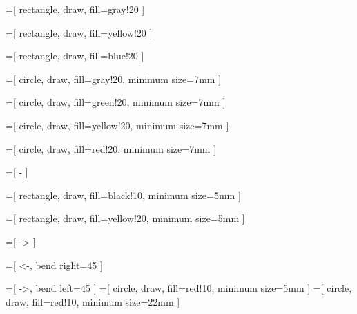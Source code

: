 
=[
	rectangle,
	draw,
	fill=gray!20
]

=[
	rectangle,
	draw,
	fill=yellow!20
]

=[
	rectangle,
	draw,
	fill=blue!20
]

=[
	circle,
	draw,
	fill=gray!20,
	minimum size=7mm
]

=[
	circle,
	draw,
	fill=green!20,
	minimum size=7mm
]

=[
	circle,
	draw,
	fill=yellow!20,
	minimum size=7mm
]

=[
	circle,
	draw,
	fill=red!20,
	minimum size=7mm
]

=[
	-
]

=[
	rectangle,
	draw,
	fill=black!10,
	minimum size=5mm
]

=[
	rectangle,
	draw,
	fill=yellow!20,
	minimum size=5mm
]

=[
	->
]

=[
	<-,
	bend right=45
]

=[
	->,
	bend left=45
]
=[
	circle,
	draw,
	fill=red!10,
	minimum size=5mm
]
=[
	circle,
	draw,
	fill=red!10,
	minimum size=22mm
]

\newcommand{\atomlegend}[2]{
	\node [rectangle,draw,fill=blue!20,minimum width=0.8cm] (body) at(#1,#2) {};
	\node [] (bodyLabel)							at(#1+1.4,#2)			{hypothèse};
	\node [rectangle,draw,fill=yellow!20,minimum width=0.8cm] (head) at(#1,#2-0.5) {};
	\node [] (headLabel)							at(#1+1.4,#2-0.5)
	{conclusion};
	\node [rectangle,draw,fill=green!20,minimum width=0.8cm] (fr) at(#1,#2-1) {};
	\node [] (frLabel)							at(#1+1.4,#2-1)				{frontière};
}

\newcommand{\lightatomlegend}[2]{
	\node [rectangle,draw,fill=blue!20,minimum width=0.8cm] (body) at(#1,#2) {};
	\node [] (bodyLabel)							at(#1+1.4,#2)			{hypothèse};
	\node [rectangle,draw,fill=yellow!20,minimum width=0.8cm] (head) at(#1,#2-0.5) {};
	\node [] (headLabel)							at(#1+1.4,#2-0.5)
	{conclusion};
}


